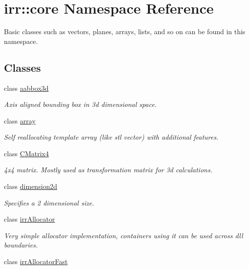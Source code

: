 \hypertarget{namespaceirr_1_1core}{}\section{irr\+:\+:core Namespace Reference}
\label{namespaceirr_1_1core}


Basic classes such as vectors, planes, arrays, lists, and so on can be found in this namespace.  


\subsection*{Classes}
\begin{DoxyCompactItemize}
\item 
class \hyperlink{classirr_1_1core_1_1aabbox3d}{aabbox3d}
\begin{DoxyCompactList}\small\item\em Axis aligned bounding box in 3d dimensional space. \end{DoxyCompactList}\item 
class \hyperlink{classirr_1_1core_1_1array}{array}
\begin{DoxyCompactList}\small\item\em Self reallocating template array (like stl vector) with additional features. \end{DoxyCompactList}\item 
class \hyperlink{classirr_1_1core_1_1CMatrix4}{C\+Matrix4}
\begin{DoxyCompactList}\small\item\em 4x4 matrix. Mostly used as transformation matrix for 3d calculations. \end{DoxyCompactList}\item 
class \hyperlink{classirr_1_1core_1_1dimension2d}{dimension2d}
\begin{DoxyCompactList}\small\item\em Specifies a 2 dimensional size. \end{DoxyCompactList}\item 
class \hyperlink{classirr_1_1core_1_1irrAllocator}{irr\+Allocator}
\begin{DoxyCompactList}\small\item\em Very simple allocator implementation, containers using it can be used across dll boundaries. \end{DoxyCompactList}\item 
class \hyperlink{classirr_1_1core_1_1irrAllocatorFast}{irr\+Allocator\+Fast}

\end{DoxyCompactItemize}
